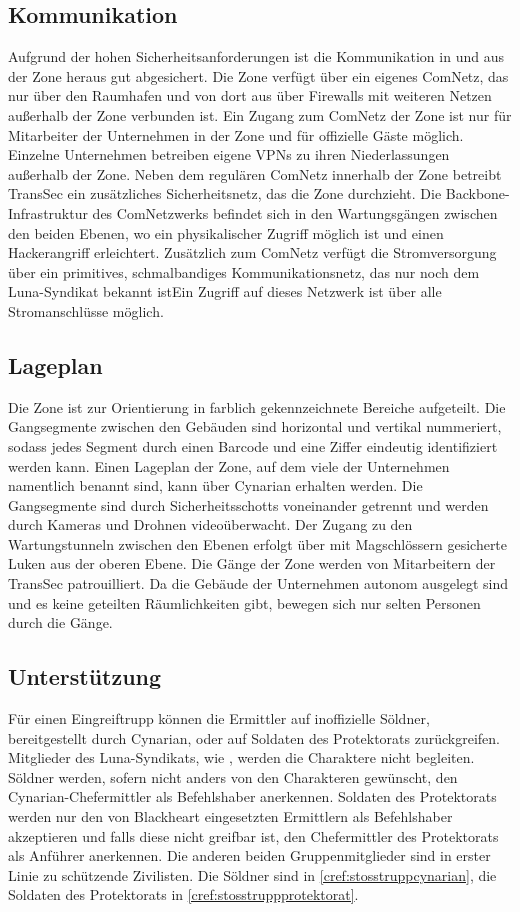 \subsection{Kommunikation}
Aufgrund der hohen Sicherheitsanforderungen ist die Kommunikation in und aus der Zone heraus gut abgesichert. Die Zone verfügt über ein eigenes ComNetz, das nur über den Raumhafen und von dort aus über Firewalls mit weiteren Netzen außerhalb der Zone verbunden ist. Ein Zugang zum ComNetz der Zone ist nur für Mitarbeiter der Unternehmen in der Zone und für offizielle Gäste möglich. Einzelne Unternehmen betreiben eigene VPNs zu ihren Niederlassungen außerhalb der Zone. Neben dem regulären ComNetz innerhalb der Zone betreibt TransSec ein zusätzliches Sicherheitsnetz, das die Zone durchzieht. Die Backbone-Infrastruktur des ComNetzwerks befindet sich in den Wartungsgängen zwischen den beiden Ebenen, wo ein physikalischer Zugriff möglich ist und einen Hackerangriff erleichtert. Zusätzlich zum ComNetz verfügt die Stromversorgung über ein primitives, schmalbandiges Kommunikationsnetz, das nur noch dem Luna-Syndikat bekannt istEin Zugriff auf dieses Netzwerk ist über alle Stromanschlüsse möglich.

\subsection{Lageplan} 
Die Zone ist zur Orientierung in farblich gekennzeichnete Bereiche aufgeteilt. Die Gangsegmente zwischen den Gebäuden sind horizontal und vertikal nummeriert, sodass jedes Segment durch einen Barcode und eine Ziffer eindeutig identifiziert werden kann. Einen Lageplan der Zone, auf dem viele der Unternehmen namentlich benannt sind, kann über Cynarian erhalten werden. Die Gangsegmente sind durch Sicherheitsschotts voneinander getrennt und werden durch Kameras und Drohnen videoüberwacht. Der Zugang zu den Wartungstunneln zwischen den Ebenen erfolgt über mit Magschlössern gesicherte Luken aus der oberen Ebene. Die Gänge der Zone werden von Mitarbeitern der TransSec patrouilliert. Da die Gebäude der Unternehmen autonom ausgelegt sind und es keine geteilten Räumlichkeiten gibt, bewegen sich nur selten Personen durch die Gänge.

\subsection{Unterstützung} 
Für einen Eingreiftrupp können die Ermittler auf inoffizielle Söldner, bereitgestellt durch Cynarian, oder auf Soldaten des Protektorats zurückgreifen. Mitglieder des Luna-Syndikats, wie \xl{}, werden die Charaktere nicht begleiten. Söldner werden, sofern nicht anders von den Charakteren gewünscht, den Cynarian-Chefermittler als Befehlshaber anerkennen. Soldaten des Protektorats werden nur den von Blackheart eingesetzten Ermittlern als Befehlshaber akzeptieren und falls diese nicht greifbar ist, den Chefermittler des Protektorats als Anführer anerkennen. Die anderen beiden Gruppenmitglieder sind in erster Linie zu schützende Zivilisten. Die Söldner sind in \cref{cref:stosstruppcynarian}, die Soldaten des Protektorats in \cref{cref:stosstruppprotektorat}.

